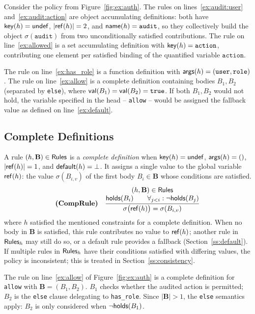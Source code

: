 \begin{example}
  Consider the policy from Figure~\ref{fig:ex:auth}.
  The rules on lines~\ref{ex:audit:user} and~\ref{ex:audit:action} are object accumulating
  definitions: both have $\mathsf{key}(h) = \mathsf{undef}$, $|\mathsf{ref}(h)| = 2$, and $\mathsf{name}(h) = \texttt{audit}$,
  so they collectively build the object $\sigma(\texttt{audit})$ from two unconditionally satisfied contributions.
  The rule on line~\ref{ex:allowed} is a set accumulating definition with
  $\mathsf{key}(h) = \texttt{action}$, contributing one element per satisfied binding of the quantified variable $\texttt{action}$.

  The rule on line~\ref{ex:has_role} is a function definition with
  $\mathsf{args}(h) = (\texttt{user}, \texttt{role})$.
  The rule on line~\ref{ex:allow} is a complete definition containing bodies $B_1,B_2$ (separated by \texttt{else}), where $\mathsf{val}(B_1) = \mathsf{val}(B_2) = \texttt{true}$.
  If both $B_1,B_2$ would not hold, the variable specified in the head -- \texttt{allow} -- would be assigned the fallback value \false as defined on line~\ref{ex:default}.
\end{example}

\subsection{Complete Definitions}
\label{ss:complete}


A rule $(h, \mathbf{B}) \in \mathsf{Rules}$ is a \emph{complete definition} when $\mathsf{key}(h) = \mathsf{undef}$,
$\mathsf{args}(h) = ()$, $|\mathsf{ref}(h)| = 1$, and $\mathsf{default}(h) = \bot$.
It assigns a single value to the global variable $\mathsf{ref}(h)$: the value $\sigma(B_{i,v})$
of the first body $B_i \in \mathbf{B}$ whose conditions are satisfied.
\[
\textbf{(CompRule)}\quad
\inferrule{
  (h, \mathbf{B}) \in \Rules \\
  \Holds(B_i) \qquad \forall_{j < i} : \neg\Holds(B_j)
}{
  \sigma\bigl(\RuleRef(h)\bigr) = \sigma(B_{i,v})
}
\]
where $h$ satisfied the mentioned constraints for a complete definition.
When no body in $\mathbf{B}$ is satisfied, this rule contributes no value to $\mathsf{ref}(h)$;
another rule in $\mathsf{Rules}_h$ may still do so, or a default rule provides a fallback
(Section~\ref{ss:default}).
If multiple rules in $\mathsf{Rules}_h$ have their conditions satisfied with differing values,
the policy is inconsistent; this is treated in Section~\ref{ss:consistency}.

\begin{example}
  The rule on line~\ref{ex:allow} of Figure~\ref{fig:ex:auth} is a complete definition
  for \texttt{allow} with $\mathbf{B} = (B_1, B_2)$.
  $B_1$ checks whether the audited action is permitted; $B_2$ is the \texttt{else} clause
  delegating to \texttt{has\_role}.
  Since $|\mathbf{B}| > 1$, the \texttt{else} semantics apply: $B_2$ is only considered
  when $\neg\mathsf{holds}(B_1)$.
\end{example}

